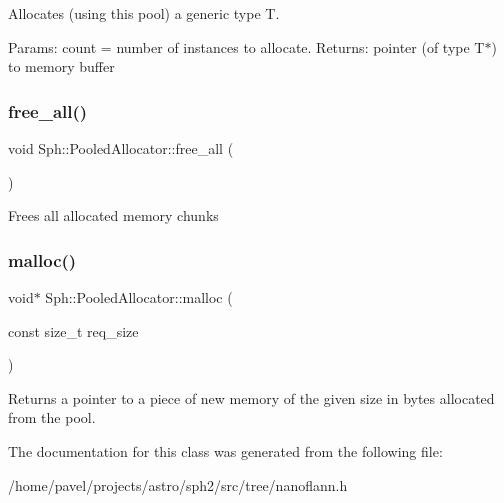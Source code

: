 Allocates (using this pool) a generic type T.

Params\+: count = number of instances to allocate. Returns\+: pointer (of type T$\ast$) to memory buffer \hypertarget{classSph_1_1PooledAllocator_aba832ee65b680cd0b128471fedc749df}{}\label{classSph_1_1PooledAllocator_aba832ee65b680cd0b128471fedc749df} 
\subsubsection{\texorpdfstring{free\+\_\+all()}{free\_all()}}
{\footnotesize\ttfamily void Sph\+::\+Pooled\+Allocator\+::free\+\_\+all (\begin{DoxyParamCaption}{ }\end{DoxyParamCaption})\hspace{0.3cm}{\ttfamily [inline]}}

Frees all allocated memory chunks \hypertarget{classSph_1_1PooledAllocator_a9a9976d06e621b3f2815538c01c1ca26}{}\label{classSph_1_1PooledAllocator_a9a9976d06e621b3f2815538c01c1ca26} 
\subsubsection{\texorpdfstring{malloc()}{malloc()}}
{\footnotesize\ttfamily void$\ast$ Sph\+::\+Pooled\+Allocator\+::malloc (\begin{DoxyParamCaption}\item[{const size\+\_\+t}]{req\+\_\+size }\end{DoxyParamCaption})\hspace{0.3cm}{\ttfamily [inline]}}

Returns a pointer to a piece of new memory of the given size in bytes allocated from the pool. 

The documentation for this class was generated from the following file\+:\begin{DoxyCompactItemize}
\item 
/home/pavel/projects/astro/sph2/src/tree/nanoflann.\+h\end{DoxyCompactItemize}
